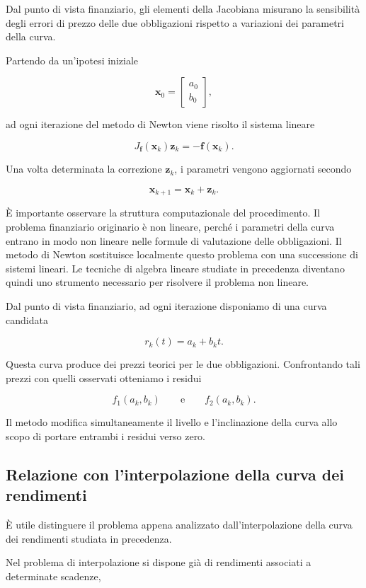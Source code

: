 Dal punto di vista finanziario, gli elementi della Jacobiana misurano la sensibilità degli errori di prezzo delle due obbligazioni rispetto a variazioni dei parametri della curva.

Partendo da un'ipotesi iniziale

\[
\mathbf{x}_0
=
\begin{bmatrix}
a_0\\
b_0
\end{bmatrix},
\]

ad ogni iterazione del metodo di Newton viene risolto il sistema lineare

\[
J_{\mathbf f}(\mathbf{x}_k)\mathbf{z}_k
=
-\mathbf{f}(\mathbf{x}_k).
\]

Una volta determinata la correzione $\mathbf{z}_k$, i parametri vengono aggiornati secondo

\[
\mathbf{x}_{k+1}
=
\mathbf{x}_k+\mathbf{z}_k.
\]

È importante osservare la struttura computazionale del procedimento. Il problema finanziario originario è non lineare, perché i parametri della curva entrano in modo non lineare nelle formule di valutazione delle obbligazioni. Il metodo di Newton sostituisce localmente questo problema con una successione di sistemi lineari. Le tecniche di algebra lineare studiate in precedenza diventano quindi uno strumento necessario per risolvere il problema non lineare.

Dal punto di vista finanziario, ad ogni iterazione disponiamo di una curva candidata

\[
r_k(t)=a_k+b_kt.
\]

Questa curva produce dei prezzi teorici per le due obbligazioni. Confrontando tali prezzi con quelli osservati otteniamo i residui

\[
f_1(a_k,b_k)
\qquad \text{e} \qquad
f_2(a_k,b_k).
\]

Il metodo modifica simultaneamente il livello e l'inclinazione della curva allo scopo di portare entrambi i residui verso zero.

\subsection{Relazione con l'interpolazione della curva dei rendimenti}

È utile distinguere il problema appena analizzato dall'interpolazione della curva dei rendimenti studiata in precedenza.

Nel problema di interpolazione si dispone già di rendimenti associati a determinate scadenze,

